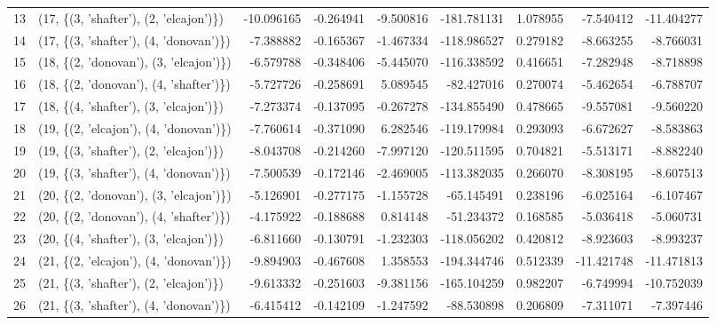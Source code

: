 \begin{tabular}{llrrrrrrr}
13 &  (17, \{(3, 'shafter'), (2, 'elcajon')\}) & -10.096165 & -0.264941 & -9.500816 & -181.781131 &  1.078955 &  -7.540412 & -11.404277 \\
14 &  (17, \{(3, 'shafter'), (4, 'donovan')\}) &  -7.388882 & -0.165367 & -1.467334 & -118.986527 &  0.279182 &  -8.663255 &  -8.766031 \\
15 &  (18, \{(2, 'donovan'), (3, 'elcajon')\}) &  -6.579788 & -0.348406 & -5.445070 & -116.338592 &  0.416651 &  -7.282948 &  -8.718898 \\
16 &  (18, \{(2, 'donovan'), (4, 'shafter')\}) &  -5.727726 & -0.258691 &  5.089545 &  -82.427016 &  0.270074 &  -5.462654 &  -6.788707 \\
17 &  (18, \{(4, 'shafter'), (3, 'elcajon')\}) &  -7.273374 & -0.137095 & -0.267278 & -134.855490 &  0.478665 &  -9.557081 &  -9.560220 \\
18 &  (19, \{(2, 'elcajon'), (4, 'donovan')\}) &  -7.760614 & -0.371090 &  6.282546 & -119.179984 &  0.293093 &  -6.672627 &  -8.583863 \\
19 &  (19, \{(3, 'shafter'), (2, 'elcajon')\}) &  -8.043708 & -0.214260 & -7.997120 & -120.511595 &  0.704821 &  -5.513171 &  -8.882240 \\
20 &  (19, \{(3, 'shafter'), (4, 'donovan')\}) &  -7.500539 & -0.172146 & -2.469005 & -113.382035 &  0.266070 &  -8.308195 &  -8.607513 \\
21 &  (20, \{(2, 'donovan'), (3, 'elcajon')\}) &  -5.126901 & -0.277175 & -1.155728 &  -65.145491 &  0.238196 &  -6.025164 &  -6.107467 \\
22 &  (20, \{(2, 'donovan'), (4, 'shafter')\}) &  -4.175922 & -0.188688 &  0.814148 &  -51.234372 &  0.168585 &  -5.036418 &  -5.060731 \\
23 &  (20, \{(4, 'shafter'), (3, 'elcajon')\}) &  -6.811660 & -0.130791 & -1.232303 & -118.056202 &  0.420812 &  -8.923603 &  -8.993237 \\
24 &  (21, \{(2, 'elcajon'), (4, 'donovan')\}) &  -9.894903 & -0.467608 &  1.358553 & -194.344746 &  0.512339 & -11.421748 & -11.471813 \\
25 &  (21, \{(3, 'shafter'), (2, 'elcajon')\}) &  -9.613332 & -0.251603 & -9.381156 & -165.104259 &  0.982207 &  -6.749994 & -10.752039 \\
26 &  (21, \{(3, 'shafter'), (4, 'donovan')\}) &  -6.415412 & -0.142109 & -1.247592 &  -88.530898 &  0.206809 &  -7.311071 &  -7.397446 \\
\bottomrule
\end{tabular}
